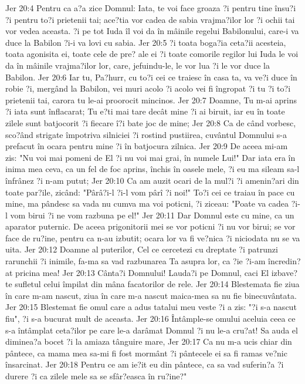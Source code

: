 Jer 20:4  Pentru ca a?a zice Domnul: Iata, te voi face groaza ?i pentru tine însu?i ?i pentru to?i prietenii tai; ace?tia vor cadea de sabia vrajma?ilor lor ?i ochii tai vor vedea aceasta. ?i pe tot Iuda îl voi da în mâinile regelui Babilonului, care-i va duce la Babilon ?i-i va lovi cu sabia.
Jer 20:5  ?i toata boga?ia ceta?ii acesteia, toata agonisita ei, toate cele de pre? ale ei ?i toate comorile regilor lui Iuda le voi da în mâinile vrajma?ilor lor, care, jefuindu-le, le vor lua ?i le vor duce la Babilon.
Jer 20:6  Iar tu, Pa?hurr, cu to?i cei ce traiesc în casa ta, va ve?i duce în robie ?i, mergând la Babilon, vei muri acolo ?i acolo vei fi îngropat ?i tu ?i to?i prietenii tai, carora tu le-ai proorocit mincinos.
Jer 20:7  Doamne, Tu m-ai aprins ?i iata sunt înflacarat; Tu e?ti mai tare decât mine ?i ai biruit, iar eu în toate zilele sunt batjocorit ?i fiecare î?i bate joc de mine;
Jer 20:8  Ca de când vorbesc, sco?ând strigate împotriva silniciei ?i rostind pustiirea, cuvântul Domnului s-a prefacut în ocara pentru mine ?i în batjocura zilnica.
Jer 20:9  De aceea mi-am zis: "Nu voi mai pomeni de El ?i nu voi mai grai, în numele Lui!" Dar iata era în inima mea ceva, ca un fel de foc aprins, închis în oasele mele, ?i eu ma sileam sa-l înfrânez ?i n-am putut;
Jer 20:10  Ca am auzit ocari de la mul?i ?i amenin?ari din toate par?ile, zicând: "Pârâ?i-l ?i-l vom pârî ?i noi!" To?i cei ce traiau în pace cu mine, ma pândesc sa vada nu cumva ma voi poticni, ?i ziceau: "Poate va cadea ?i-l vom birui ?i ne vom razbuna pe el!"
Jer 20:11  Dar Domnul este cu mine, ca un aparator puternic. De aceea prigonitorii mei se vor poticni ?i nu vor birui; se vor face de ru?ine, pentru ca n-au izbutit; ocara lor va fi ve?nica ?i niciodata nu se va uita.
Jer 20:12  Doamne al puterilor, Cel ce cercetezi cu dreptate ?i patrunzi rarunchii ?i inimile, fa-ma sa vad razbunarea Ta asupra lor, ca ?ie ?i-am încredin?at pricina mea!
Jer 20:13  Cânta?i Domnului! Lauda?i pe Domnul, caci El izbave?te sufletul celui împilat din mâna facatorilor de rele.
Jer 20:14  Blestemata fie ziua în care m-am nascut, ziua în care m-a nascut maica-mea sa nu fie binecuvântata.
Jer 20:15  Blestemat fie omul care a adus tatalui meu veste ?i a zis: "?i s-a nascut fiu", ?i s-a bucurat mult de aceasta.
Jer 20:16  Întâmple-se omului aceluia ceea ce s-a întâmplat ceta?ilor pe care le-a darâmat Domnul ?i nu le-a cru?at! Sa auda el diminea?a bocet ?i la amiaza tânguire mare,
Jer 20:17  Ca nu m-a ucis chiar din pântece, ca mama mea sa-mi fi fost mormânt ?i pântecele ei sa fi ramas ve?nic însarcinat.
Jer 20:18  Pentru ce am ie?it eu din pântece, ca sa vad suferin?a ?i durere ?i ca zilele mele sa se sfâr?easca în ru?ine?"
